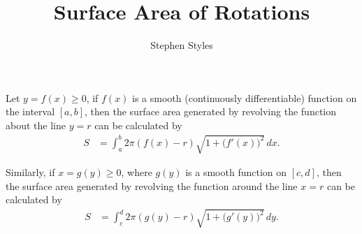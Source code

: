 \documentclass[16pt]{article}
\title{Surface Area of Rotations}
\author{Stephen Styles}
\theoremstyle{remark}
\begin{document}
\maketitle

Let $y = f(x) \geq 0$, if $f(x)$ is a smooth (continuously differentiable) function on the interval ${[a,b]}$, then the surface area generated by revolving the function about the line $y=r$ can be calculated by
\begin{align*}
S &= \int_a^b 2\pi (f(x)-r) \sqrt{1+ \big( f'(x) \big)^2} \, dx.
\end{align*}

Similarly, if $x = g(y) \geq 0$, where $g(y)$ is a smooth function on ${[c,d]}$, then the surface area generated by revolving the function around the line $x=r$ can be calculated by
\begin{align*}
S &= \int_c^d 2\pi (g(y)-r) \sqrt{1+\big( g'(y) \big)^2} \, dy.
\end{align*}
\end{document}
